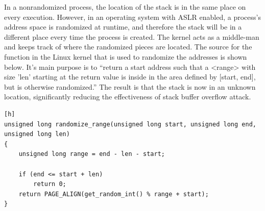 In a nonrandomized process, the location of the stack is in the same place on every execution. However, in an operating system with ASLR enabled, a process’s address space is randomized at runtime, and therefore the stack will be in a different place every time the process is created. The kernel acts as a middle-man and keeps track of where the randomized pieces are located. The source for the function in the Linux kernel that is used to randomize the addresses is shown below. It’s main purpose is to “return a start address such that a <range> with size 'len' starting at the return value is inside in the area defined by [start, end], but is otherwise randomized.” \cite{randomc} The result is that the stack is now in an unknown location, significantly reducing the effectiveness of stack buffer overflow attack.

\begin{lstlisting}[caption=Source for the range randomization function][h]
unsigned long randomize_range(unsigned long start, unsigned long end, unsigned long len)
{
	unsigned long range = end - len - start;

	if (end <= start + len)
		return 0;
	return PAGE_ALIGN(get_random_int() % range + start);
}
\end{lstlisting}
